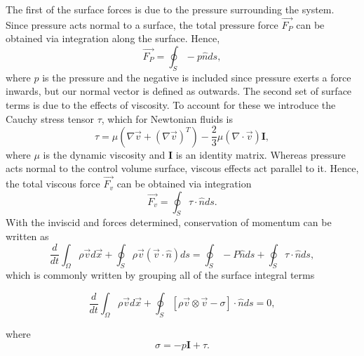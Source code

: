 The first of the surface forces is due to the pressure surrounding the system. Since pressure acts normal to a surface, the total pressure force $\vec{F_P}$ can be obtained via integration along the surface. Hence,
\begin{equation}
	\vec{F_P} = \oint_S -p\hat{n} ds,
\end{equation}
where $p$ is the pressure and the negative is included since pressure exerts a force inwards, but our normal vector is defined as outwards. The second set of surface terms is due to the effects of viscosity. To account for these we introduce the Cauchy stress tensor $\tau$, which for Newtonian fluids is~\cite{hirschNumericalComputationInternal2007a}
\begin{equation}
	\label{eqn:cauchytensor}
	\tau = \mu \left(\nabla \vec{v} + \left(\nabla \vec{v} \right)^T \right) - \frac{2}{3} \mu \left(\nabla \cdot \vec{v} \right) \mathbf{I},
\end{equation}
where $\mu$ is the dynamic viscosity and $\mathbf{I}$ is an identity matrix. Whereas pressure acts normal to the control volume surface, viscous effects act parallel to it. Hence, the total viscous force $\vec{F_v}$ can be obtained via integration
\begin{equation}
	\vec{F_v} = \oint_S \tau \cdot \hat{n} ds.
\end{equation}
With the inviscid and forces determined, conservation of momentum can be written as
\begin{equation}
	 \frac{d}{dt}\int_\Omega \rho \vec{v} d\vec{x} + \oint_S \rho \vec{v} (\vec{v} \cdot \hat{n}) ds = \oint_S -P\hat{n} ds + \oint_S \tau \cdot \hat{n} ds,
\end{equation}
which is commonly written by grouping all of the surface integral terms
\begin{eqBox}
\begin{equation}
	 \frac{d}{dt}\int_\Omega \rho \vec{v} d\vec{x} + \oint_S \left[ \rho \vec{v} \otimes \vec{v} - \sigma \right]\cdot \hat{n} ds =  0,
\end{equation}
\end{eqBox}
where
\begin{equation}
	\sigma = -p \mathbf{I} + \tau.
\end{equation}

